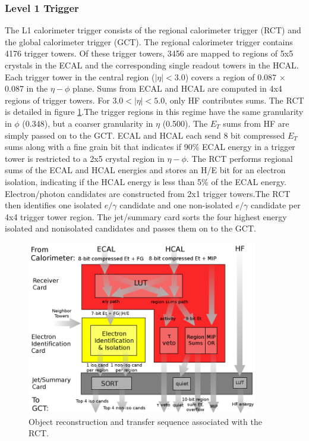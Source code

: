 \documentclass[oneside, letterpaper, oldfontcommands]{memoir}
\begin{document}
\subsubsection{Level 1 Trigger}\label{L1trig}

\qquad The L1 calorimeter trigger consists of the regional calorimeter trigger (RCT) and the global calorimeter trigger (GCT). The regional calorimeter trigger contains 4176 trigger towers. Of these trigger towers, 3456 are mapped to regions of 5x5 crystals in the ECAL and the corresponding single readout towers in the HCAL. Each trigger tower in the central region ($|\eta| < 3.0$) covers a region of 0.087 $\times$ 0.087 in the $\eta - \phi$ plane. Sums from ECAL and HCAL are computed in 4x4 regions of trigger towers. For $3.0 < |\eta| < 5.0$, only HF contributes sums. The RCT is detailed in figure \ref{fig:rct}.The trigger regions in this regime have the same granularity in $\phi$ (0.348), but a coarser granularity in $\eta$ (0.500). The $E_{T}$ sums from HF are simply passed on to the GCT. ECAL and HCAL each send 8 bit compressed $E_{T}$ sums along with a fine grain bit that indicates if 90\% ECAL energy in a trigger tower is restricted to a 2x5 crystal region in $\eta - \phi$. The RCT performs regional sums of the ECAL and HCAL energies and stores an H/E bit for an electron isolation, indicating if the HCAL energy is less than 5\% of the ECAL energy. Electron/photon candidates are constructed from 2x1 trigger towers.The RCT then identifies one isolated $e/\gamma$ candidate and one non-isolated $e/\gamma$ candidate per 4x4 trigger tower region. The jet/summary card sorts the four highest energy isolated and nonisolated candidates and passes them on to the GCT. 

\begin{figure}[here]
\includegraphics[width=0.9\textwidth]{rct.png}
\caption{Object reconstruction and transfer sequence associated with the RCT.}
\label{fig:rct}
\end{figure}
\end{document}
